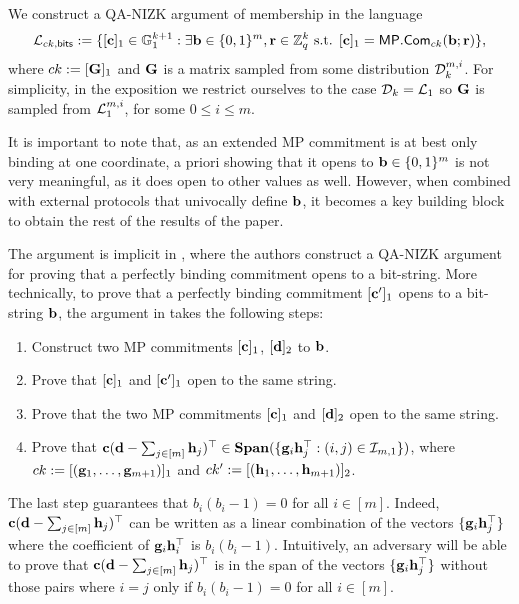 We construct a QA-NIZK argument of membership in the language
$$
\mathcal{L}_{ck,\mathsf{bits}} := \{[\mathbf{c}]_1\in\mathbb{G}_1^{k+1} : \exists \mathbf{b}\in\{0,1\}^m,\mathbf{r}\in\mathbb{Z}_q^k \text{ s.t. } [\mathbf{c}]_1 = \mathsf{MP}.\mathsf{Com}_{ck}(\mathbf{b};\mathbf{r})\},
$$
where $ck:=[\mathbf{{G}}]_1$ and $\mathbf{{G}}$ is a matrix sampled from 
some distribution $\mathcal{D}_k^{m,i}$. For simplicity, in the exposition we restrict ourselves to the case $\mathcal{D}_k=\mathcal{L}_{1}$ so  $\mathbf{{G}}$ is sampled from $\mathcal{L}_1^{m,i}$, for some $0 \leq i \leq m$.

It is important to note that, as an extended MP commitment is at best only binding at one coordinate, a priori showing that it opens to $\mathbf{b} \in \{0,1\}^m$ is not very meaningful, as it does open to other values as well. However, when combined with external protocols that univocally define $\mathbf{b}$, it becomes a key building block to obtain the rest of the results of the paper.  

The argument is implicit in \cite{AC:GonHevRaf15}, where the authors construct a QA-NIZK argument for proving that a perfectly binding commitment opens to a bit-string. More technically, to prove that a  perfectly binding commitment $[\mathbf{c}']_1$ opens to a bit-string $\mathbf{b}$, the argument in \cite{AC:GonHevRaf15} takes the following steps:
\begin{enumerate}
\item Construct two MP commitments $[\mathbf{c}]_1$, 
$[\mathbf{d}]_2$ to $\mathbf{b}$. 
\item Prove that $[\mathbf{c}]_1$ and $[\mathbf{c}']_1$ open to the same string. 
\item Prove that the two MP commitments $[\mathbf{c}]_1$ and $[\mathbf{d}]_2$ open to the same string.
\item Prove that $\mathbf{c}(\mathbf{d}-\sum_{j \in [m]}
\mathbf{h}_j)^\top\in\mathbf{Span}(\{\mathbf{g}_i\mathbf{h}_j^\top:(i,j)\in\mathcal{I}_{m,1}\})$, where $ck:=[(\mathbf{g}_1,\ldots,\mathbf{g}_{m+1})]_1$ and $ck':=[(\mathbf{h}_1,\ldots,\mathbf{h}_{m+1})]_2$.
\end{enumerate}
The last step guarantees that 
$b_i(b_i-1)=0$ for all $i \in [m]$. Indeed, 
$\mathbf{c}(\mathbf{d}-\sum_{j \in [m]}
\mathbf{h}_j)^\top$ can be written as a linear combination of the vectors $\{\mathbf{g}_i\mathbf{h}_j^\top\}$ where the coefficient of $\mathbf{g}_i\mathbf{h}_i^{\top}$ is $b_i(b_i-1)$. Intuitively, an adversary will be able to prove that $\mathbf{c}(\mathbf{d}-\sum_{j \in [m]}
\mathbf{h}_j)^\top$ is in the span of the vectors  $\{\mathbf{g}_i\mathbf{h}_j^\top\}$ without those pairs where $i=j$ only if $b_i(b_i-1)=0$ for all $i \in [m]$. 



